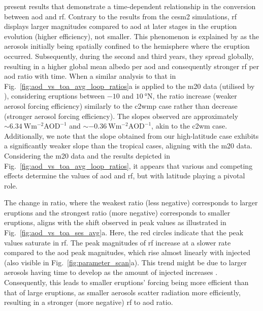 \documentclass{ametsocV6.1}
\newcommand{\iso}[1][i]{{#1}njected \ce{SO2}}
\begin{document}
\citet[][their Fig.\ 1c,d]{marshall2020} present results that demonstrate a
time-dependent relationship in the conversion between \gls{aod} and \gls{rf}. Contrary
to the results from the \gls{cesm2} simulations, \gls{rf} displays larger magnitudes
compared to \gls{aod} at later stages in the eruption evolution (higher efficiency), not
smaller. This phenomenon is explained by \citet{marshall2020} as the aerosols initially
being spatially confined to the hemisphere where the eruption occurred. Subsequently,
during the second and third years, they spread globally, resulting in a higher global
mean albedo per \gls{aod} and consequently stronger \gls{rf} per \gls{aod} ratio with
time. When a similar analysis to that in Fig.~\ref{fig:aod_vs_toa_avg_loop_ratios}a is
applied to the \gls{m20} data (utilised by \citet{marshall2020}), considering eruptions
between \(-10\) and \(\SI{10}{\degree\mathrm{N}}\), the ratio increase (weaker aerosol
forcing efficiency) similarly to the \gls{c2wmp} case rather than decrease (stronger
aerosol forcing efficiency). The slopes observed are approximately
\(\sim\SI{6.34}{\watt\metre^{-2}\mathrm{AOD}^{-1}}\) and
\(\sim\SI{-0.36}{\watt\metre^{-2}\mathrm{AOD}^{-1}}\), akin to the \gls{c2wm} case.
Additionally, we note that the slope obtained from our high-latitude case exhibits a
significantly weaker slope than the tropical cases, aligning with the \gls{m20} data.
Considering the \gls{m20} data and the results depicted in
Fig.~\ref{fig:aod_vs_toa_avg_loop_ratios}, it appears that various and competing effects
determine the values of \gls{aod} and \gls{rf}, but with latitude playing a pivotal
role.

The change in ratio, where the weakest ratio (less negative) corresponds to larger
eruptions and the strongest ratio (more negative) corresponds to smaller eruptions,
aligns with the shift observed in peak values as illustrated in
Fig.~\ref{fig:aod_vs_toa_ses_avg}a. Here, the red circles indicate that the peak values
saturate in \gls{rf}. The peak magnitudes of \gls{rf} increase at a slower rate compared
to the \gls{aod} peak magnitudes, which rise almost linearly with \iso{} (also visible
in Fig.~\ref{fig:parameter_scan}a). This trend might be due to larger aerosols having
time to develop as the amount of \iso{} increases \citep{niemeier2015,marshall2019}.
Consequently, this leads to smaller eruptions' forcing being more efficient than that of
large eruptions, as smaller aerosols scatter radiation more efficiently, resulting in a
stronger (more negative) \gls{rf} to \gls{aod} ratio.
\end{document}
